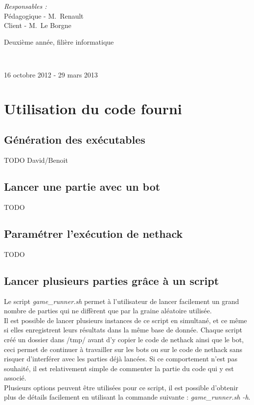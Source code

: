 \documentclass[10pt,a4paper]{report}
\begin{document}
\begin{center}
\begin{center}
  
  \begin{flushright}
    \large
    \emph{Responsables :}\\
    Pédagogique - M.~Renault\\
    Client - M.~Le Borgne\\
  \end{flushright}
\end{center}

                  
{\large Deuxième année, filière informatique}

~

{\large 16 octobre 2012 - 29 mars 2013}\\
                  
\end{center}
\thispagestyle{empty}
\pagebreak

\chapter{Utilisation du code fourni}
\section{Génération des exécutables}
TODO David/Benoit

\section{Lancer une partie avec un bot}
TODO

\section{Paramétrer l'exécution de nethack}
TODO

\section{Lancer plusieurs parties grâce à un script}
Le script \emph{game\_runner.sh} permet à l'utilisateur de lancer facilement
un grand nombre de parties qui ne diffèrent que par la graine aléatoire
utilisée.
\\
Il est possible de lancer plusieurs instances de ce script en simultané, et ce
même si elles enregistrent leurs résultats dans la même base de donnée. Chaque
script créé un dossier dans /tmp/ avant d'y copier le code de nethack ainsi que
le bot, ceci permet de continuer à travailler sur les bots ou sur le code de
nethack sans risquer d'interférer avec les parties déjà lancées. Si ce
comportement n'est pas souhaité, il est relativement simple de commenter la
partie du code qui y est associé.
\\
Plusieurs options peuvent être utilisées pour ce script, il est possible
d'obtenir plus de détails facilement en utilisant la commande suivante :
\emph{game\_runner.sh -h}.
\end{document}
